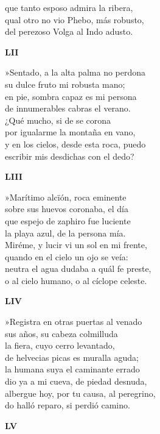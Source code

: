 \documentclass[11pt,twoside]{article}
\newcommand{\guno}{\textbf{\emph{G}\textsuperscript{1}}}
\begin{document}
que tanto esposo admira la ribera,\\
qual otro no vio Phebo, más robusto,\\
del perezoso Volga al Indo adusto.\par\poend
%
\begin{center}
	\textbf{LII}
\end{center}\postart
»Sentado, a la alta palma no perdona\\
su dulce fruto mi robusta mano;\\
en pie, sombra capaz es mi persona\\
de innumerables cabras el verano.\\
¿Qué mucho, si de \footA{nubes}{nieues {\guno}} se corona\\
por igualarme la montaña en vano,\\
y en los cielos, desde esta roca, puedo\\
escribir mis desdichas con el dedo?\par\poend
%
\begin{center}
	\textbf{LIII}
\end{center}\postart
»Marítimo alcïón, roca eminente\\
sobre sus huevos coronaba, el día\\
que espejo de zaphiro fue luciente\\
la playa azul, de la persona mía.\\
Miréme, y lucir vi un sol en mi frente,\\
quando en el cielo un ojo se veía:\\
neutra el agua dudaba a quál fe preste,\\
o al cielo humano, o al cíclope celeste.\par\poend
%
\begin{center}
	\textbf{LIV}
\end{center}\postart
»Registra en otras puertas al venado\\
sus años, su cabeza colmilluda\\
la fiera, cuyo cerro levantado,\\
de helvecias picas es muralla aguda;\\
la humana suya el caminante errado\\
dio ya a mi cueva, de piedad desnuda,\\
albergue hoy, por tu causa, al peregrino,\\
do halló reparo, si perdió camino.\par\poend
%
\begin{center}
	\textbf{LV}
\end{center}\postart
\end{document}
